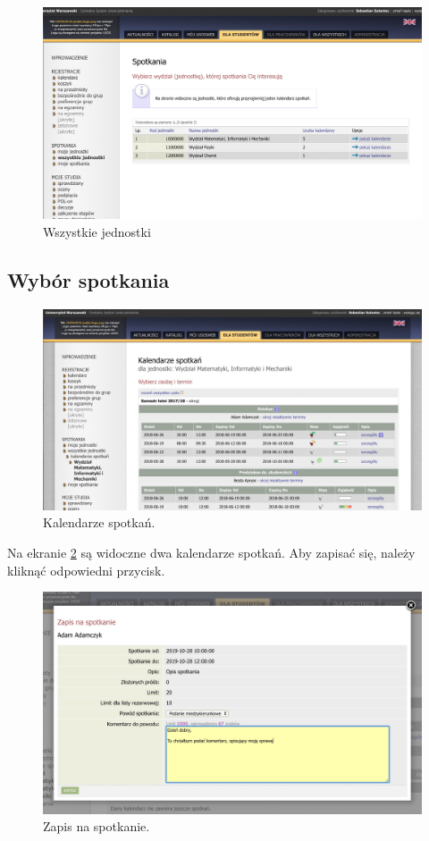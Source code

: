 \documentclass[licencjacka]{pracamgr}
\begin{document}
\begin{figure}[!]
  \includegraphics[width=\linewidth]{wszystkie_jednostki_usosweb.jpg}
  \caption{Wszystkie jednostki}
  \label{fig:wszjweb}
\end{figure}


\subsection{Wybór spotkania}

\begin{figure}[!]
  \includegraphics[width=\linewidth]{kalendarzUSOSweb.jpg}
  \caption{Kalendarze spotkań.}
  \label{fig:kalweb}
\end{figure}

Na ekranie \ref{fig:kalweb} są widoczne dwa kalendarze spotkań. Aby zapisać się, należy kliknąć odpowiedni przycisk.

\begin{figure}[!]
  \includegraphics[width=\linewidth]{zapisUSOSweb.jpg}
  \caption{Zapis na spotkanie.}
  \label{fig:zapisweb}
\end{figure}
\end{document}
